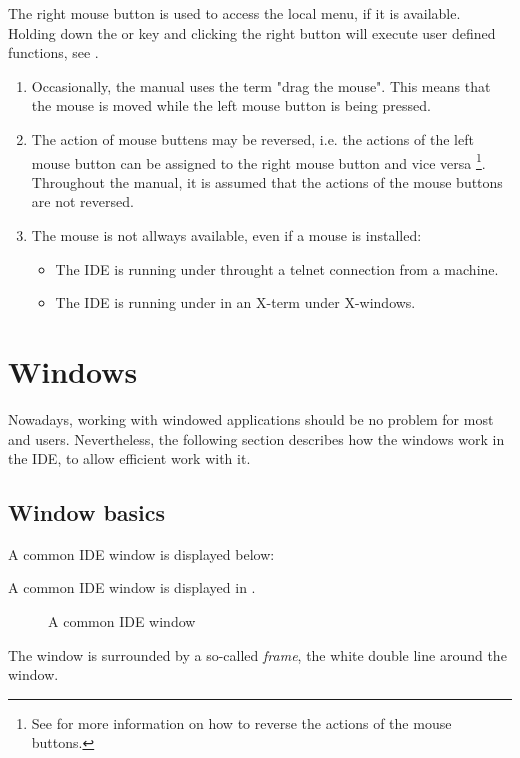 The right mouse button is used to access the local menu, if
it is available. Holding down the  or  key and 
clicking the right button will execute user defined functions, 
see .

\begin{remark}
\begin{enumerate}
\item Occasionally, the manual uses the term "drag the mouse". This
means that the mouse is moved while the left mouse button is being 
pressed.
\item 
The action of mouse buttens may be reversed, i.e. the actions of the left
mouse button can be assigned to the right mouse button and vice versa  
\footnote{See  for more information on how to reverse the
actions of the mouse buttons.}. Throughout the manual, it is assumed 
that the actions of the mouse buttons are not reversed.
\item
The mouse is not allways available, even if a mouse is installed:
\begin{itemize}
\item The IDE is running under \linux throught a telnet connection from 
a \windows machine.
\item The IDE is running under \linux in an X-term under X-windows.
\end{itemize}
\end{enumerate}
\end{remark}

\section{Windows}
\label{se:windows}
Nowadays, working with windowed applications should be no problem for
most \windows and \linux users. Nevertheless, the following section 
describes how the windows work in the \fpc IDE, to allow efficient 
work with it.
%
%
\subsection{Window basics}
\label{se:windowbasics}
\begin{htmlonly}
A common IDE window is displayed  below:
\end{htmlonly}
\begin{latexonly}
A common IDE window is displayed in .
\begin{figure}
\caption{A common IDE window}
\label{fig:idewin}
\ifpdf
{}
\else
{}
\fi
\end{figure}
\end{latexonly}
The window is surrounded by a so-called \emph{frame}, the white double
line around the window. 

